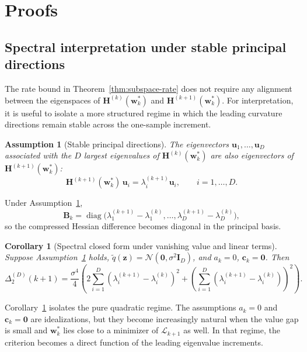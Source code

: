 \documentclass{article}
\newtheorem{assumption}{Assumption}
\newtheorem{corollary}[theorem]{Corollary}
\begin{document}
\appendix

\section{Proofs}
\label{app:proofs}

\allowdisplaybreaks

\subsection{Spectral interpretation under stable principal directions}
\label{app:spectral}

The rate bound in Theorem~\ref{thm:subspace-rate} does not require any alignment between the eigenspaces of $\mathbf H^{(k)}(\mathbf w_k^*)$ and $\mathbf H^{(k+1)}(\mathbf w_k^*)$. For interpretation, it is useful to isolate a more structured regime in which the leading curvature directions remain stable across the one-sample increment.

\begin{assumption}[Stable principal directions]
\label{ass:stable-principal}
The eigenvectors $\mathbf u_1,\dots,\mathbf u_D$ associated with the $D$ largest eigenvalues of $\mathbf H^{(k)}(\mathbf w_k^*)$ are also eigenvectors of $\mathbf H^{(k+1)}(\mathbf w_k^*)$:
\[
\mathbf H^{(k+1)}(\mathbf w_k^*)\,\mathbf u_i
=
\lambda_i^{(k+1)}\mathbf u_i,
\qquad i=1,\dots,D.
\]
\end{assumption}

Under Assumption~\ref{ass:stable-principal},
\[
\mathbf B_k
=
\operatorname{diag}\bigl(
\lambda_1^{(k+1)}-\lambda_1^{(k)},
\dots,
\lambda_D^{(k+1)}-\lambda_D^{(k)}
\bigr),
\]
so the compressed Hessian difference becomes diagonal in the principal basis.

\begin{corollary}[Spectral closed form under vanishing value and linear terms]
\label{cor:spectral}
Suppose Assumption~\ref{ass:stable-principal} holds, $\tilde q(\mathbf z)=\mathcal N(\mathbf 0,\sigma^2\mathbf I_D)$, and $a_k=0$, $\mathbf c_k=\mathbf 0$. Then
\begin{equation}
\label{eq:spectral-closed-form}
\Delta_2^{(D)}(k+1)
=
\frac{\sigma^4}{4}
\left(
2\sum_{i=1}^D (\lambda_i^{(k+1)}-\lambda_i^{(k)})^2
+
\left(
\sum_{i=1}^D (\lambda_i^{(k+1)}-\lambda_i^{(k)})
\right)^2
\right).
\end{equation}
\end{corollary}

Corollary~\ref{cor:spectral} isolates the pure quadratic regime. The assumptions $a_k=0$ and $\mathbf c_k=\mathbf 0$ are idealizations, but they become increasingly natural when the value gap is small and $\mathbf w_k^*$ lies close to a minimizer of $\mathcal L_{k+1}$ as well. In that regime, the criterion becomes a direct function of the leading eigenvalue increments.
\end{document}
